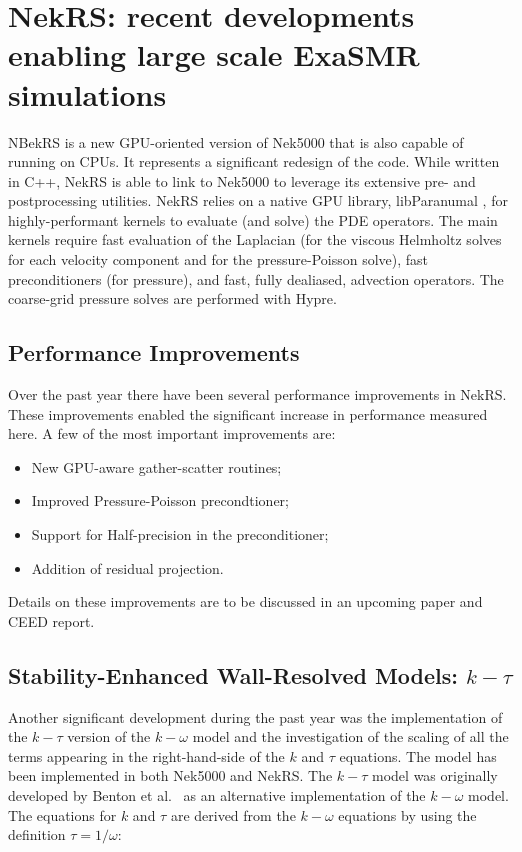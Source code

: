 \section{NekRS: recent developments enabling large scale ExaSMR simulations}
\label{sec:nekrs}

NBekRS is a new GPU-oriented version of Nek5000  that is also capable of running
on CPUs. It represents a significant redesign of the code. While written in
C++, NekRS is able to link to Nek5000 to leverage its extensive pre- and
postprocessing utilities. NekRS relies on a native GPU library,
libParanumal \cite{libP}, for highly-performant kernels to evaluate (and
solve) the PDE operators.  The main kernels require fast evaluation of the
Laplacian (for the viscous Helmholtz solves for each velocity component and
for the pressure-Poisson solve), fast preconditioners (for pressure), and
fast, fully dealiased, advection operators.  The coarse-grid pressure solves
are performed with Hypre.

\subsection{Performance Improvements}

Over the past year there have been several performance improvements in NekRS. These improvements enabled the significant increase in performance measured here.
A few of the most important improvements are:
\begin{itemize}
  \item New GPU-aware gather-scatter routines;
  \item Improved Pressure-Poisson precondtioner;  
  \item Support for Half-precision in the preconditioner;
  \item Addition of residual projection.
\end{itemize}
Details on these improvements are to be discussed in an upcoming paper and CEED report.

\subsection{Stability-Enhanced Wall-Resolved Models: $k-\tau$}
Another significant development during the past year was the implementation of the $k-\tau$
version of the $k-\omega$ model and the investigation of the scaling of all the terms appearing in
the right-hand-side of the $k$ and $\tau$ equations. The model has been implemented in both Nek5000 and NekRS. The $k-\tau$ model was originally developed by Benton et al.~\cite{benton1996application} as an alternative
implementation of the $k-\omega$ model. The equations for $k$ and $\tau$ are derived from the $k-\omega$
equations by using the definition $\tau=1/\omega$:


